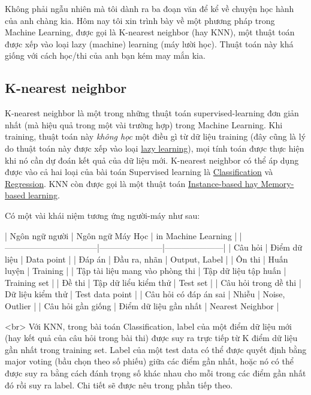 Không phải ngẫu nhiên mà tôi dành ra ba đoạn văn để kể về chuyện học hành của anh chàng kia. Hôm nay tôi xin trình bày về một phương pháp trong Machine Learning, được gọi là K-nearest neighbor (hay KNN), một thuật toán được xếp vào loại lazy (machine) learning (máy lười học). Thuật toán này khá giống với cách học/thi của anh bạn kém may mắn kia. 
 
 
 
\subsection{K-nearest neighbor }
 
K-nearest neighbor là một trong những thuật toán supervised-learning đơn giản nhất (mà hiệu quả trong một vài trường hợp) trong Machine Learning. Khi training, thuật toán này \textit{không học} một điều gì từ dữ liệu training (đây cũng là lý do thuật toán này được xếp vào loại \href{https://en.wikipedia.org/wiki/Lazy_learning}{lazy learning}), mọi tính toán được thực hiện khi nó cần dự đoán kết quả của dữ liệu mới. K-nearest neighbor có thể áp dụng được vào cả hai loại của bài toán Supervised learning là \href{http://machinelearningcoban.com/2016/12/27/categories/#classification-phan-loai}{Classification} và \href{http://machinelearningcoban.com/2016/12/27/categories/#regression-hoi-quy}{Regression}. KNN còn được gọi là một thuật toán \href{https://en.wikipedia.org/wiki/Instance-based_learning}{Instance-based hay Memory-based learning}. 
 
Có một vài khái niệm tương ứng người-máy như sau: 
 
|          Ngôn ngữ người         |    Ngôn ngữ Máy Học   | in Machine Learning | 
|---------------------------------|-----------------------|---------------------| 
| Câu hỏi                         | Điểm dữ liệu          | Data point          | 
| Đáp án                          | Đầu ra, nhãn          | Output, Label       | 
| Ôn thi                          | Huấn luyện            | Training            | 
| Tập tài liệu mang vào phòng thi | Tập dữ liệu tập huấn  | Training set        | 
| Đề thi                          | Tập dữ liểu kiểm thử  | Test set            | 
| Câu hỏi trong dề thi            | Dữ liệu kiểm thử      | Test data point     | 
| Câu hỏi có đáp án sai           | Nhiễu                 | Noise, Outlier      | 
| Câu hỏi gần giống               | Điểm dữ liệu gần nhất | Nearest Neighbor    | 
  
 
<br> 
Với KNN, trong bài toán Classification, label của một điểm dữ liệu mới (hay kết quả của câu hỏi trong bài thi) được suy ra trực tiếp từ K điểm dữ liệu gần nhất trong training set. Label của một test data có thể được quyết định bằng major voting (bầu chọn theo số phiếu) giữa các điểm gần nhất, hoặc nó có thể được suy ra bằng cách đánh trọng số khác nhau cho mỗi trong các điểm gần nhất đó rồi suy ra label. Chi tiết sẽ được nêu trong phần tiếp theo. 
 
